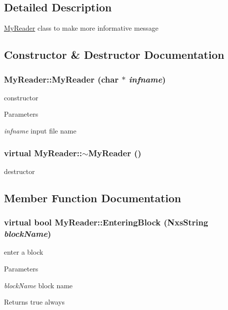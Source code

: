 \subsection{Detailed Description}
\hyperlink{classMyReader}{MyReader} class to make more informative message 

\subsection{Constructor \& Destructor Documentation}
\hypertarget{classMyReader_a739b792f1ac98c5a80720c13f34f2e31}{
\subsubsection[{MyReader}]{\setlength{\rightskip}{0pt plus 5cm}MyReader::MyReader (char $\ast$ {\em infname})}}
\label{classMyReader_a739b792f1ac98c5a80720c13f34f2e31}
constructor 
\begin{DoxyParams}{Parameters}
\item[{\em infname}]input file name \end{DoxyParams}
\hypertarget{classMyReader_a16fff4945fbe5120e2ba761dbdf157dd}{
\subsubsection[{$\sim$MyReader}]{\setlength{\rightskip}{0pt plus 5cm}virtual MyReader::$\sim$MyReader ()}}
\label{classMyReader_a16fff4945fbe5120e2ba761dbdf157dd}
destructor 

\subsection{Member Function Documentation}
\hypertarget{classMyReader_a9ec496b979676b633003d5d3534c026c}{
\subsubsection[{EnteringBlock}]{\setlength{\rightskip}{0pt plus 5cm}virtual bool MyReader::EnteringBlock ({\bf NxsString} {\em blockName})}}
\label{classMyReader_a9ec496b979676b633003d5d3534c026c}
enter a block 
\begin{DoxyParams}{Parameters}
\item[{\em blockName}]block name \end{DoxyParams}
\begin{DoxyReturn}{Returns}
true always 
\end{DoxyReturn}


